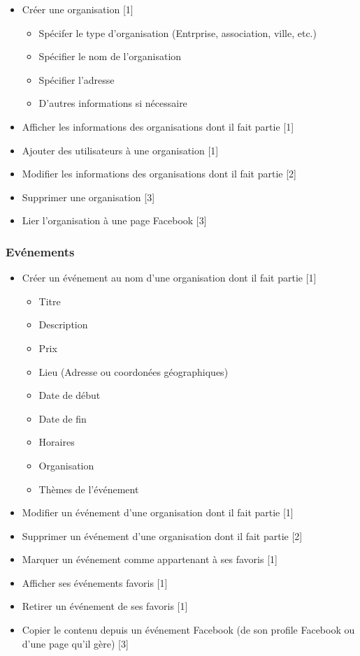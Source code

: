 \documentclass[11pt, a4paper, french, twoside]{article}
\begin{document}
				\begin{itemize}
					\item Créer une organisation [1]
						\begin{itemize}
							\item Spécifer le type d'organisation (Entrprise, association, ville, etc.)
							\item Spécifier le nom de l'organisation
							\item Spécifier l'adresse
							\item D'autres informations si nécessaire
						\end{itemize}
					\item Afficher les informations des organisations dont il fait partie [1]
					\item Ajouter des utilisateurs à une organisation [1]
					\item Modifier les informations des organisations dont il fait partie [2]
					\item Supprimer une organisation [3]
					\item Lier l'organisation à une page Facebook [3]
				\end{itemize}
			
			\subsubsection{Evénements}
			\label{subsubsec:evenements}
				\begin{itemize}
					\item Créer un événement au nom d'une organisation dont il fait partie [1]
						\begin{itemize}
							\item Titre
							\item Description
							\item Prix
							\item Lieu (Adresse ou coordonées géographiques)
							\item Date de début
							\item Date de fin
							\item Horaires
							\item Organisation
							\item Thèmes de l'événement
						\end{itemize}
					\item Modifier un événement d'une organisation dont il fait partie [1]
					\item Supprimer un événement d'une organisation dont il fait partie [2]
					\item Marquer un événement comme appartenant à ses favoris [1]
					\item Afficher ses événements favoris [1]
					\item Retirer un événement de ses favoris [1]
					\item Copier le contenu depuis un événement Facebook (de son profile Facebook ou d'une page qu'il gère) [3]
				\end{itemize}
			
\end{document}

